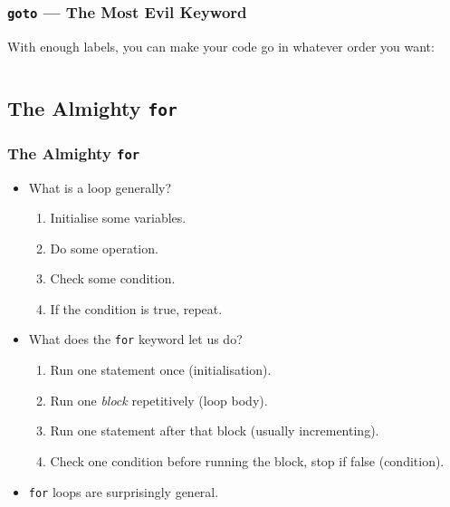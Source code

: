\documentclass[xcolor]{beamer}
\begin{document}
\begin{frame}
	\frametitle{\texttt{goto} --- The Most Evil Keyword}
	\pause
	
	With enough labels, you can make your code go in whatever order you want:
	\pause
	
	\begin{columns}
		\begin{column}{0.45\textwidth}
			\centering
			
		\end{column}
		\pause
		\begin{column}{0.45\textwidth}
			\centering
			
		\end{column}
	\end{columns}
\end{frame}

\subsection{The Almighty \texttt{for}}

\begin{frame}
	\frametitle{The Almighty \texttt{for}}
	\pause
	
	\begin{itemize}
		\item What is a loop generally?
		\pause
		
		\begin{enumerate}
			\item Initialise some variables.
			\pause
			\item Do some operation.
			\pause
			\item Check some condition.
			\pause
			\item If the condition is true, repeat.
		\end{enumerate}
		\pause
		
		\item What does the \texttt{for} keyword let us do?
		\pause
		
		\begin{enumerate}
			\item Run one statement once (initialisation).
			\pause
			\item Run one \textit{block} repetitively (loop body).
			\pause
			\item Run one statement after that block (usually incrementing).
			\pause
			\item Check one condition before running the block, stop if false (condition).
		\end{enumerate}
		\pause
		
		\item \texttt{for} loops are surprisingly general.
	\end{itemize}
\end{frame}
\end{document}

